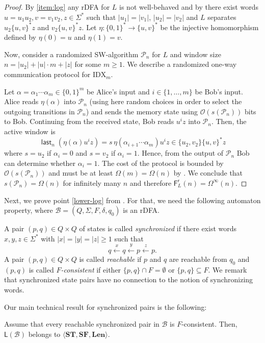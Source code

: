 \documentclass{theoretics}
\newcommand{\B}{\mathcal{B}}
\renewcommand{\O}{\mathcal{O}}
\renewcommand{\P}{\mathcal{P}}
\newcommand{\F}{\mathsf{F}}
\renewcommand{\L}{\mathsf{L}}
\renewcommand{\r}{\mathsf{r}}
\DeclareMathOperator{\last}{\mathsf{last}}
\newcommand{\Len}{\mathbf{Len}}
\newcommand{\ST}{\mathbf{ST}}
\newcommand{\SF}{\mathbf{SF}}
\renewcommand{\geq}{\geqslant}
\renewcommand{\ge}{\geq}
\newcommand{\Omegainf}{\Omega^{\scriptscriptstyle{\infty}}}
\begin{document}
\begin{proof}
By \ref{item:log} any rDFA for $L$ is not well-behaved 
and by  there exist words $u = u_1u_2, v = v_1v_2, z \in \Sigma^*$
such that $|u_1| = |v_1|$, $|u_2| = |v_2|$ and $L$ separates $u_2\{u,v\}^*z$ and $v_2\{u,v\}^*z$.
Let $\eta \colon \{0,1\}^* \to \{u,v\}^*$ be the injective homomorphism defined by
$\eta(0) = u$ and $\eta(1) = v$.

Now, consider a randomized SW-algorithm $\P_n$ for $L$ and window size
$n = |u_2| + |u| \cdot m + |z|$ for some $m \ge 1$.
We describe a randomized one-way communication protocol for $\mathrm{IDX}_m$.

Let $\alpha = \alpha_1 \cdots \alpha_m \in\{0,1\}^m$ be Alice's input and $i\in\{1,\dots,m\}$ be Bob's input.
Alice reads $\eta(\alpha)$ into $\P_n$ (using here random choices in order to select the outgoing
transitions in $\P_n$) and sends the memory state using $\O(s(\P_n))$ bits to Bob.
Continuing from the received state, Bob reads $u^i z$ into $\P_n$.
Then, the active window is
\[
	\last_n(\eta(\alpha) u^i z) = s \, \eta(\alpha_{i+1} \cdots \alpha_m) u^i z \in \{u_2,v_2\}\{u,v\}^*z
\]
where $s = u_2$ if $\alpha_i = 0$ and $s = v_2$ if $\alpha_i = 1$.
Hence, from the output of $\P_n$ Bob can determine whether $\alpha_i = 1$.
The cost of the protocol is bounded by $\O(s(\P_n))$
and must be at least $\Omega(m) = \Omega(n)$ by .
We conclude that $s(\P_n) = \Omega(n)$ for infinitely many $n$
and therefore $\F^\r_L(n) = \Omegainf(n)$.
\end{proof}

Next, we prove point \ref{lower-log} from .
For that, we need the following automaton property, where 
$\B = (Q,\Sigma,F,\delta,q_0)$ is an rDFA. 

A pair $(p,q)\in Q\times Q$ of states is called {\em synchronized}
if there exist words $x,y,z\in\Sigma^*$ with $|x|=|y|=|z| \geq 1$ such that
\[ 
q \xleftarrow{x} q  \xleftarrow{y} p \xleftarrow{z} p .
\]
A pair $(p,q)\in Q\times Q$ is called {\em reachable} if $p$ and $q$ are reachable from $q_0$
and $(p,q)$ is called {\em $F$-consistent} if either $\{p,q\} \cap F = \emptyset$
or $\{p,q\} \subseteq F$.
We remark that synchronized state pairs have no connection to the notion of synchronizing words.


Our main technical result for synchronized pairs is the following:

\begin{lemma}\label{lem:sync-pair}
Assume that every reachable synchronized pair in $\B$ is $F$-consistent.
Then, $\L(\B)$ belongs to $\langle \ST, \SF, \Len \rangle$.
\end{lemma}
\end{document}
